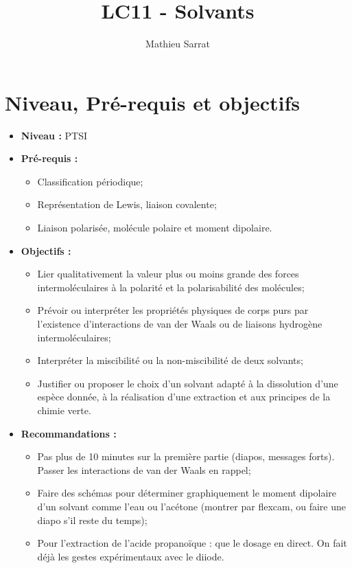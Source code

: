 \documentclass[11pt,a4paper]{report}
\author{Mathieu Sarrat}
\title{LC11 - Solvants}
\begin{document}
\maketitle

\section*{Niveau, Pré-requis et objectifs}
\begin{itemize}
	\item \textbf{Niveau :} PTSI\\
	
	\item \textbf{Pré-requis :}
	\begin{itemize}
		\item Classification périodique;
		\item Représentation de Lewis, liaison covalente;
		\item Liaison polarisée, molécule polaire et moment dipolaire.\\
	\end{itemize}
	
	\item \textbf{Objectifs :}
	\begin{itemize}
		\item Lier qualitativement la valeur plus ou moins grande des forces intermoléculaires à la 			polarité et la polarisabilité des molécules;
		\item Prévoir ou interpréter les propriétés physiques de corps purs par l'existence 					d'interactions de van der Waals ou de liaisons hydrogène intermoléculaires; 
		\item Interpréter la miscibilité ou la non-miscibilité de deux solvants;
		\item Justifier ou proposer le choix d'un solvant adapté à la dissolution d'une espèce 					donnée, à la réalisation d'une extraction et aux principes de la chimie verte.\\
	\end{itemize}
		
	\item \textbf{Recommandations :}
	\begin{itemize}
		\item Pas plus de 10 minutes sur la première partie (diapos, messages forts). Passer les 					interactions de van der Waals en rappel;
		\item Faire des schémas pour déterminer graphiquement le moment dipolaire d'un solvant comme 				l'eau ou l'acétone (montrer par flexcam, ou faire une diapo s'il reste du temps);
		\item Pour l'extraction de l'acide propanoïque : que le dosage en direct. On fait déjà les 					gestes expérimentaux avec le diiode.
	\end{itemize}
\end{itemize}
\end{document}
